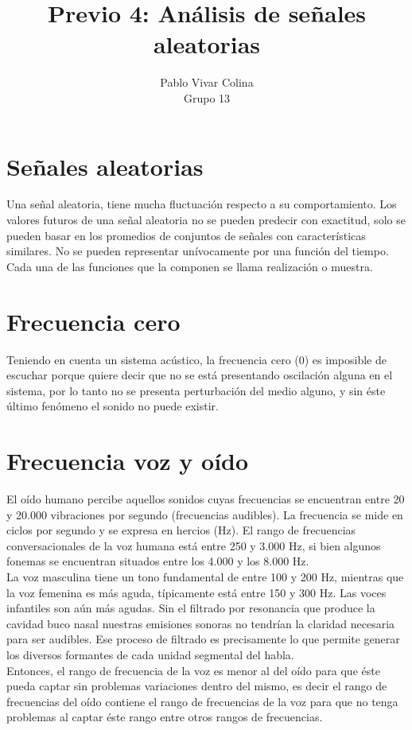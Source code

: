 \documentclass{article}
\title{Previo 4: Análisis de señales aleatorias}
\author{Pablo Vivar Colina\\
Grupo 13
}
\begin{document}
\maketitle

\section{Señales aleatorias}

Una señal aleatoria, tiene mucha fluctuación respecto a su comportamiento. Los valores futuros de una señal aleatoria no se pueden predecir con exactitud, solo se pueden basar en los promedios de conjuntos de señales con características similares. No se pueden representar unívocamente por una función del tiempo. Cada una de las funciones que la componen se llama realización o muestra.\citep{SenialesDeterministicas}\\

\section{Frecuencia cero}

Teniendo en cuenta un sistema acústico, la frecuencia cero (0) es imposible de escuchar porque quiere decir que no se está presentando oscilación alguna en el sistema, por lo tanto no se presenta perturbación del medio alguno, y sin éste último fenómeno el sonido no puede existir.\\

\section{Frecuencia voz y oído}

 El oído humano percibe aquellos sonidos cuyas frecuencias se encuentran entre 20 y 20.000 vibraciones por segundo (frecuencias audibles). La frecuencia se mide en ciclos por segundo y se expresa en hercios (Hz). El rango de frecuencias conversacionales de la voz humana está entre 250 y 3.000 Hz, si bien algunos fonemas se encuentran situados entre los 4.000 y los 8.000 Hz.\citep{TransmisionVoz}\\
 
 
 La voz masculina tiene un tono fundamental de entre 100 y 200 Hz, mientras que la voz femenina es más aguda, típicamente está entre 150 y 300 Hz. Las voces infantiles son aún más agudas. Sin el filtrado por resonancia que produce la cavidad buco nasal nuestras emisiones sonoras no tendrían la claridad necesaria para ser audibles. Ese proceso de filtrado es precisamente lo que permite generar los diversos formantes de cada unidad segmental del habla.\citep{TransmisionVoz}\\
 
 Entonces, el rango de frecuencia de la voz es menor al del oído para que éste pueda captar sin problemas variaciones dentro del mismo, es decir el rango de frecuencias del oído contiene el rango de frecuencias de la voz para que no tenga problemas al captar éste rango entre otros rangos de frecuencias.
 

 




\end{document}
